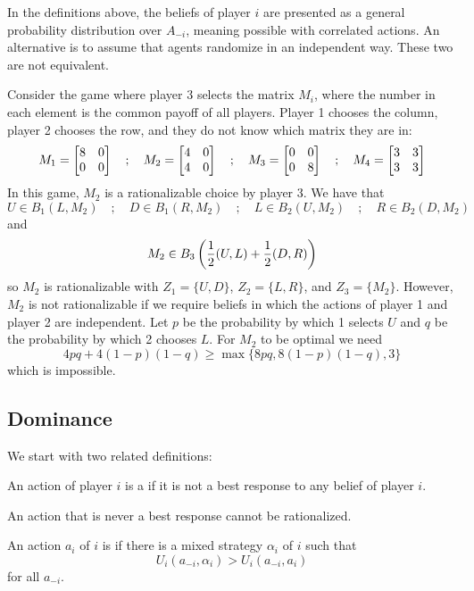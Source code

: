 \documentclass[10pt]{article}
\begin{document}
\begin{remark}
	In the definitions above, the beliefs of player $i$ are presented as a general probability distribution over $A_{-i}$, meaning possible with correlated actions. An alternative is to assume that agents randomize in an independent way. These two are not equivalent.
\end{remark}
\begin{counterex}
	Consider the game where player 3 selects the matrix $M_i$, where the number in each element is the common payoff of all players. Player 1 chooses the column, player 2 chooses the row, and they do not know which matrix they are in: \[M_1 = \begin{bmatrix}8 & 0 \\ 0&0\end{bmatrix} \quad;\quad M_2 = \begin{bmatrix}4 & 0 \\ 4&0\end{bmatrix}\quad;\quad M_3 = \begin{bmatrix}0 & 0 \\ 0&8\end{bmatrix}\quad;\quad M_4 = \begin{bmatrix}3 & 3 \\ 3&3\end{bmatrix}\]In this game, $M_2$ is a rationalizable choice by player 3. We have that \[U \in B_1(L,M_2)\quad;\quad D \in B_1(R,M_2)\quad;\quad L \in B_2(U,M_2)\quad;\quad R \in B_2(D,M_2)\]and \[M_2 \in B_3\left( \frac{1}{2} (U,L) + \frac{1}{2} (D,R)\right)\]so $M_2$ is rationalizable with $Z_1 = \{U,D\}$, $Z_2 = \{L,R\}$, and $Z_3 = \{M_2\}$. However, $M_2$ is not rationalizable if we require beliefs in which the actions of player 1 and player 2 are independent. Let $p$ be the probability by which 1 selects $U$ and $q$ be the probability by which 2 chooses $L$. For $M_2$ to be optimal we need \[4pq + 4(1-p)(1-q) \ge \max\{8pq,8(1-p)(1-q),3\}\]which is impossible.
\end{counterex}


\subsection{Dominance}


We start with two related definitions:

\begin{definition}
	An action of player $i$ is a  if it is not a best response to any belief of player $i$.
\end{definition}

\begin{remark}
	An action that is never a best response cannot be rationalized.
\end{remark}

\begin{definition}
	An action $a_i$ of $i$ is  if there is a mixed strategy $\alpha_i$ of $i$ such that \[U_i(a_{-i},\alpha_i) > U_i(a_{-i},a_i)\]for all $a_{-i}$.
\end{definition}
\end{document}
